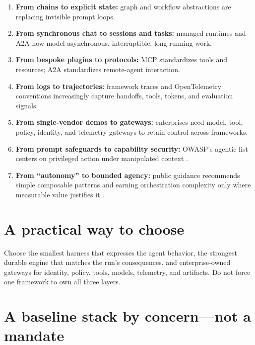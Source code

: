 \begin{enumerate}

\item \textbf{From chains to explicit state:} graph and workflow abstractions are replacing invisible prompt loops.

\item \textbf{From synchronous chat to sessions and tasks:} managed runtimes and A2A now model asynchronous, interruptible, long-running work.

\item \textbf{From bespoke plugins to protocols:} MCP standardizes tools and resources; A2A standardizes remote-agent interaction.

\item \textbf{From logs to trajectories:} framework traces and OpenTelemetry conventions increasingly capture handoffs, tools, tokens, and evaluation signals.

\item \textbf{From single-vendor demos to gateways:} enterprises need model, tool, policy, identity, and telemetry gateways to retain control across frameworks.

\item \textbf{From prompt safeguards to capability security:} OWASP’s agentic list centers on privileged action under manipulated context .

\item \textbf{From “autonomy” to bounded agency:} public guidance recommends simple composable patterns and earning orchestration complexity only where measurable value justifies it .

\end{enumerate}

\section{A practical way to choose}

Choose the smallest harness that expresses the agent behavior, the strongest durable engine that matches the run’s consequences, and enterprise-owned gateways for identity, policy, tools, models, telemetry, and artifacts. Do not force one framework to own all three layers.\par

\section{A baseline stack by concern—not a mandate}

